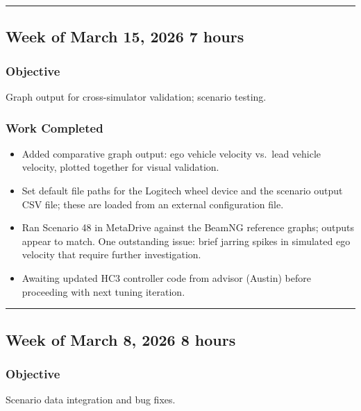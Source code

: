 \documentclass[12pt]{article}
\begin{document}
\hrule\vspace{0.5em}

\subsection{Week of March 15, 2026 \hfill \normalfont\small 7 hours}

\subsubsection{Objective}
Graph output for cross-simulator validation; scenario testing.

\subsubsection{Work Completed}
\begin{itemize}
  \item Added comparative graph output: ego vehicle velocity vs.\ lead vehicle velocity, plotted together for visual validation.
  \item Set default file paths for the Logitech wheel device and the scenario output CSV file; these are loaded from an external configuration file.
  \item Ran Scenario 48 in MetaDrive against the BeamNG reference graphs; outputs appear to match. One outstanding issue: brief jarring spikes in simulated ego velocity that require further investigation.
  \item Awaiting updated HC3 controller code from advisor (Austin) before proceeding with next tuning iteration.
\end{itemize}

\hrule\vspace{0.5em}

\subsection{Week of March 8, 2026 \hfill \normalfont\small 8 hours}

\subsubsection{Objective}
Scenario data integration and bug fixes.
\end{document}
